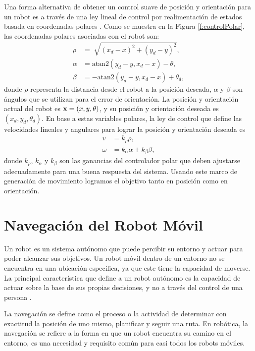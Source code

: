Una forma alternativa de obtener un control suave de posición y orientación 
para un robot es a través de una ley lineal de control por realimentación 
de estados basada en coordenadas polares \cite{chwa2004sliding}. Como se muestra 
en la Figura \ref{f:controlPolar}, las coordenadas polares asociadas con el robot 
son:
\begin{align*}
\rho &= \sqrt[]{(x_{d} - x)^2 + (y_{d} - y)^2}, \\
\alpha &= \text{atan2}(y_{d} - y, x_{d} - x) - \theta, \\
\beta &= -\text{atan2}(y_{d} - y, x_{d} - x) + \theta_{d},
\end{align*}
donde $\rho$ representa la distancia desde el robot a la posición deseada, $\alpha$
y $\beta$ son ángulos que se utilizan para el error de orientación. La posición y 
orientación actual del robot es $\mathbf x=(x,y,\theta)$, y su posición y orientación deseada 
es $(x_{d},y_{d},\theta_{d})$. En base a estas variables polares, la ley de control que 
define las velocidades lineales y angulares para lograr la posición y orientación deseada 
es 
\begin{align}
\label{eqn:v}
v &= k_{\rho}\rho, \\
\label{eqn:w}
\omega &= k_{\alpha}\alpha + k_{\beta}\beta,
\end{align}
donde $k_{\rho}$, $k_{\alpha}$ y $k_{\beta}$ son las ganancias del controlador 
polar que deben ajustarse adecuadamente para una buena respuesta del sistema. Usando 
este marco de generación de movimiento logramos el objetivo tanto en posición 
como en orientación.

\section{Navegación del Robot Móvil}

Un robot es un sistema autónomo que puede percibir su entorno y actuar para poder
alcanzar sus objetivos. Un robot móvil dentro de un entorno no se encuentra en una 
ubicación específica, ya que este tiene la capacidad de moverse. La 
principal característica que define a un robot autónomo es la capacidad de actuar 
sobre la base de sus propias decisiones, y no a través del control de una 
persona \cite{mataric2007robotics}.

La navegación se define como el proceso o la actividad de determinar con exactitud 
la posición de uno mismo, planificar y seguir una ruta. En robótica, la navegación 
se refiere a la forma en que un robot encuentra su camino en el entorno, es una 
necesidad y requisito común para casi todos los robots móviles. %

